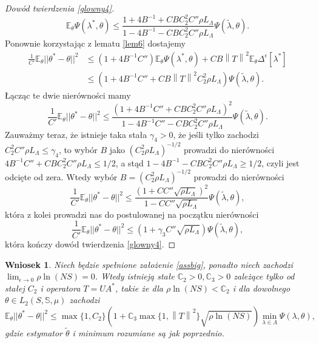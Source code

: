 \documentclass[man,mfiu]{mgrwms}
\newcommand{\norm}[1]{\left\lVert#1\right\rVert}
\newtheorem{wn}{Wniosek}[chapter]
\begin{document}
\begin{proof}[Dowód twierdzenia \ref{glowny4}]
\begin{displaymath}
\mathbb{E}_{\theta}\Psi(\lambda^*,\theta)\leq\frac{1+4B^{-1}+CBC_2^2C''\rho L_{\Lambda}}{1-4B^{-1}-CBC_2^2C''\rho L_{\Lambda}}\Psi(\tilde{\lambda},\theta).
\end{displaymath}
Ponownie korzystając z lematu \ref{lem6} dostajemy
\begin{displaymath}
\begin{split}
\frac{1}{C'}\mathbb{E}_{\theta}||\theta^*-\theta||^2&\leq (1+4B^{-1}C'')\mathbb{E}_{\theta}\Psi(\lambda^*,\theta)+CB\norm{T}^2\mathbb{E}_{\theta}\Delta^{\epsilon}[\lambda^*]\\
&\leq (1+4B^{-1}C''+CB\norm{T}^2C_2^2\rho L_{\Lambda})\Psi(\tilde{\lambda},\theta).
\end{split}
\end{displaymath}
Łącząc te dwie nierówności mamy
\begin{displaymath}
\frac{1}{C'}\mathbb{E}_{\theta}||\theta^*-\theta||^2\leq \frac{\left(1+4B^{-1}C''+CBC_2^2C''\rho L_{\Lambda}\right)^2}{1-4B^{-1}C''-CBC_2^2C''\rho L_{\Lambda}}\Psi(\tilde{\lambda},\theta).
\end{displaymath}
Zauważmy teraz, że istnieje taka stała $\gamma_4>0$, że jeśli tylko zachodzi $C_2^2C''\rho L_{\Lambda}\leq \gamma_4$, to wybór $B$ jako $(C_2^2\rho L_{\Lambda})^{-1/2}$ prowadzi do nierówności $4B^{-1}C''+CBC_2^2C''\rho L_{\Lambda}\leq 1/2$, a stąd $1-4B^{-1}-CBC_2^2C''\rho L_{\Lambda}\geq 1/2$, czyli jest odcięte od zera. Wtedy wybór $B=(C_2^2\rho L_{\Lambda})^{-1/2}$ prowadzi do nierówności
\begin{displaymath}
\frac{1}{C'}\mathbb{E}_{\theta}||\theta^*-\theta||^2\leq \frac{(1+CC''\sqrt{\rho L_{\Lambda}})^2}{1-CC''\sqrt{\rho L_{\Lambda}}}\Psi(\tilde{\lambda},\theta),
\end{displaymath}
która z kolei prowadzi nas do postulowanej na początku nierówności
\begin{displaymath}
\frac{1}{C'}\mathbb{E}_{\theta}||\theta^*-\theta||^2\leq (1+\gamma_3C''\sqrt{\rho L_{\Lambda}})\Psi(\tilde{\lambda},\theta),
\end{displaymath}
która kończy dowód twierdzenia \ref{glowny4}.
\end{proof}


\begin{wn}
Niech będzie spełnione założenie \ref{assbig}, ponadto niech zachodzi\\ $\lim_{\epsilon\to 0}\rho\ln(NS)=0$. Wtedy istnieją stałe $\mathbb{C}_2>0,\mathbb{C}_3>0$ zależące tylko od stałej $C_2$ i operatora $T=UA^*$, takie że dla $\rho\ln(NS)<\mathbb{C}_2$ i dla dowolnego $\theta\in L_2(S,\mathbb{S},\mu)$ zachodzi
\begin{displaymath}
\mathbb{E}_{\theta}||\theta^*-\theta||^2\leq \max\{1,C_2\}\left(1+\mathbb{C}_3\max\{1,\norm{T}^2\}\sqrt{\rho \ln(NS)}\right)\min_{\lambda\in \Lambda}\Psi(\lambda,\theta),
\end{displaymath}
gdzie estymator $\tilde{\theta}$ i minimum rozumiane są jak poprzednio.
\end{wn}
\end{document}
